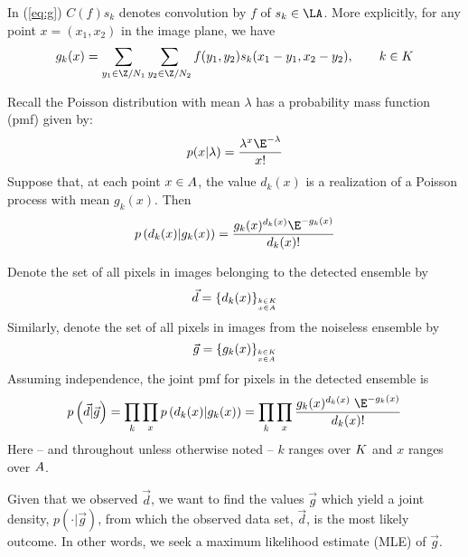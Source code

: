 In (\ref{eq:g}) $C(f)s_k$ denotes convolution by $f$ of $s_k \in
\LA$. 
More explicitly, for any point $x = (x_1,x_2)$ in the image plane, we have
\[
g_k(x) = \sum_{y_1\in \Z/N_1}\sum_{y_2\in \Z/N_2} f(y_1,y_2)s_k(x_1-y_1,x_2-y_2),
\qquad k \in \groupK
\]

Recall the Poisson distribution with mean $\lambda$
has a probability mass function (pmf) given by:
\[
p(x|\lambda) = \frac{\lambda^x \E^{-\lambda}}{x!}
\]
Suppose that, at each point $x\in A$, the value $d_k(x)$ is a
realization of a Poisson process with mean $g_k(x)$.  Then 
\[
p\left(d_k(x)|g_k(x)\right) = \frac{g_k(x)^{d_k(x)} \E^{-g_k(x)}}{d_k(x)!}
\]

Denote the set of all pixels in images belonging to the detected ensemble by
\[
\vec{d} = \left\{d_k(x)\right\}_{\stackrel{k\in K}{_{x\in A}}}
\]
Similarly, denote the set of all pixels in images from the noiseless ensemble
by
\[
\vec{g} = \left\{g_k(x)\right\}_{\stackrel{k\in K}{_{x\in A}}}
\]
Assuming independence, the joint pmf for pixels in the detected ensemble is
\begin{equation}\label{eq:jpmf}
p\left(\vec{d}| \vec{g} \right) %
= \prod_{k}\prod_{x} p\left(d_k(x)|g_k(x)\right) %
= \prod_{k}\prod_{x} \frac{g_k(x)^{d_k(x)}\; \E^{-g_k(x)}}{d_k(x)!}
\end{equation}%
Here -- and throughout unless otherwise noted -- $k$ ranges over $K$ and 
$x$ ranges over $A$.

Given that we observed $\vec{d}$, we want to find the values $\vec{g}$
which yield a joint density, $p\left(\cdot| \vec{g} \right)$, from which the observed
data set, $\vec{d} $, is the most likely outcome.  In other words, we seek a
maximum likelihood estimate (MLE) of $\vec{g}$. 

